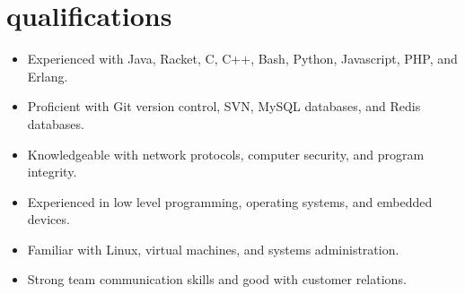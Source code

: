 \documentclass[]{friggeri-cv}
\begin{document}
\section{qualifications}
{
  \setlength{\itemsep}{0pt}
  \setlength{\parskip}{0pt}
  \setlength{\parsep}{0pt}
  \setlength{\itemindent}{0em}
  \setlength{\leftmargin}{0em}
\begin{itemize}
\item Experienced with Java, Racket, C, C++, Bash, Python, Javascript, PHP, and Erlang.
\item Proficient with Git version control, SVN, MySQL databases, and Redis databases.
\item Knowledgeable with network protocols, computer security, and program integrity.
\item Experienced in low level programming, operating systems, and embedded devices.
\item Familiar with Linux, virtual machines, and systems administration.
\item Strong team communication skills and good with customer relations.
\end{itemize}
}
\end{document}
